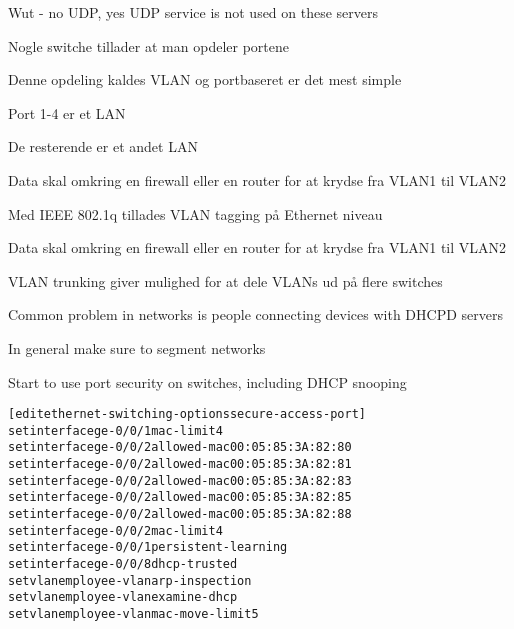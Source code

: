 \documentclass[Screen16to9,17pt]{foils}
\begin{document}
Wut - no UDP, yes UDP service is not used on these servers




\begin{list1}
\item Nogle switche tillader at man opdeler portene
\item Denne opdeling kaldes VLAN og portbaseret er det mest simple
\item Port 1-4 er et LAN
\item De resterende er et andet LAN
\item Data skal omkring en firewall eller en router for at krydse fra VLAN1 til VLAN2
\end{list1}



\begin{list1}
\item Med IEEE 802.1q tillades VLAN tagging på Ethernet niveau
\item Data skal omkring en firewall eller en router for at krydse fra VLAN1 til VLAN2
\item VLAN trunking giver mulighed for at dele VLANs ud på flere switches
\end{list1}



\begin{list1}
\item Common problem in networks is people connecting devices with DHCPD servers
\item In general make sure to segment networks
\item Start to use port security on switches, including DHCP snooping\\
\end{list1}


\begin{alltt}\small
[edit ethernet-switching-options secure-access-port]
set interface ge-0/0/1 mac-limit 4
set interface ge-0/0/2 allowed-mac 00:05:85:3A:82:80
set interface ge-0/0/2 allowed-mac 00:05:85:3A:82:81
set interface ge-0/0/2 allowed-mac 00:05:85:3A:82:83
set interface ge-0/0/2 allowed-mac 00:05:85:3A:82:85
set interface ge-0/0/2 allowed-mac 00:05:85:3A:82:88
set interface ge-0/0/2 mac-limit 4
set interface ge-0/0/1 persistent-learning
set interface ge-0/0/8 dhcp-trusted
set vlan employee-vlan arp-inspection
set vlan employee-vlan examine-dhcp
set vlan employee-vlan mac-move-limit 5
\end{alltt}
\end{document}
